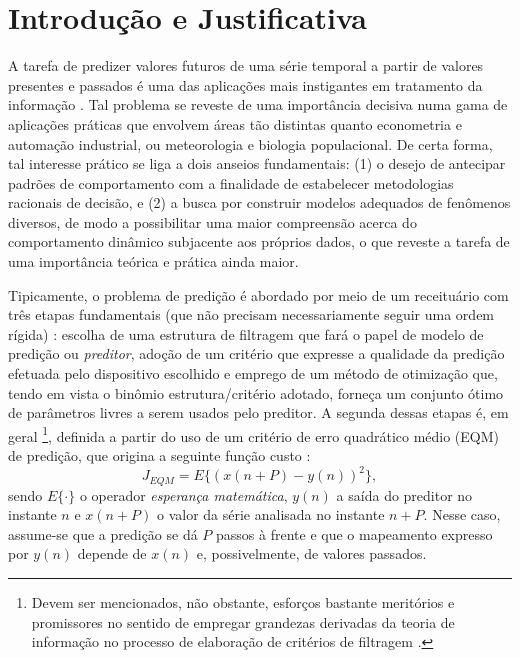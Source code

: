 \documentclass[a4paper, 12pt]{article}
\begin{document}
\section{Introdução e Justificativa}

A tarefa de predizer valores futuros de uma série temporal a partir de valores presentes e passados é uma das aplicações mais instigantes em tratamento da informação \cite{principe2000neural}. Tal problema se reveste de uma importância decisiva numa gama de aplicações práticas que envolvem áreas tão distintas quanto econometria e automação industrial, ou meteorologia e biologia populacional. De certa forma, tal interesse prático se liga a dois anseios fundamentais: (1) o desejo de antecipar padrões de comportamento com a finalidade de estabelecer metodologias racionais de decisão, e (2) a busca por construir modelos adequados de fenômenos diversos, de modo a possibilitar uma maior compreensão acerca do comportamento dinâmico subjacente aos próprios dados, o que reveste a tarefa de uma importância teórica e prática ainda maior.

Tipicamente, o problema de predição é abordado por meio de um receituário com três etapas fundamentais (que não precisam necessariamente seguir uma ordem rígida) \cite{romano2018unsupervised}: escolha de uma estrutura de filtragem que fará o papel de modelo de predição ou \textit{preditor}, adoção de um critério que expresse a qualidade da predição efetuada pelo dispositivo escolhido e emprego de um método de otimização que, tendo em vista o binômio estrutura/critério adotado, forneça um conjunto ótimo de parâmetros livres a serem usados pelo preditor. A segunda dessas etapas é, em geral \footnote{Devem ser mencionados, não obstante, esforços bastante meritórios e promissores no sentido de empregar grandezas derivadas da teoria
de informação no processo de elaboração de critérios de filtragem \cite{erdogmus2006linear}.}, definida a partir do uso de um critério de erro quadrático médio (EQM) de predição, que origina a seguinte função custo \cite{haykin2008adaptive}:
\begin{equation}
J_{EQM} = E\{(x(n + P) - y(n))^{2}\},
\end{equation}
sendo $E\{ \cdot \}$ o operador \textit{esperança matemática}, $y(n)$ a saída do preditor no instante $n$ e $x(n + P)$ o valor da série analisada no instante $n + P$. Nesse caso, assume-se que a predição se dá $P$ passos à frente e que o mapeamento expresso por $y(n)$ depende de $x(n)$ e, possivelmente, de valores passados.
\end{document}
